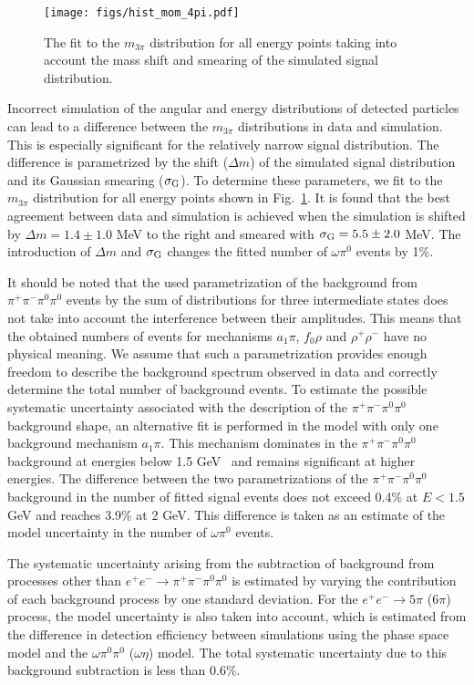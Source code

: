 \documentclass[twocolumn,aps,prd,floatfix,nofootinbib,superscriptaddress]{revtex4-2}
\begin{document}
\begin{figure}
\centering
\texttt{[image: figs/hist\_mom\_4pi.pdf]}
\caption{
	The fit to the $m_{3\pi}$ distribution for all energy points taking into account the mass shift and smearing of the simulated signal distribution.
}
\label{fig:masshist}
\end{figure}

Incorrect simulation of the angular and energy distributions of detected particles can lead to a difference between the $m_{3\pi}$ distributions in data and simulation.
This is especially significant for the relatively narrow signal distribution.
The difference is parametrized by the shift ($\Delta m$) of the simulated signal distribution and its Gaussian smearing ($\sigma_{\rm G}$).
To determine these parameters, we fit to the $m_{3\pi}$ distribution for all energy points shown in Fig.~\ref{fig:masshist}.
It is found that the best agreement between data and simulation is achieved when the simulation is shifted by \( \Delta m=1.4 \pm 1.0 \) MeV to the right and smeared with \( \sigma_{\rm G} = 5.5 \pm 2.0 \) MeV.
The introduction of $\Delta m$ and $\sigma_{\rm G}$ changes the fitted number of $\omega\pi^0$ events by 1\%.

It should be noted that the used parametrization of the background from $\pi^+\pi^-\pi^0\pi^0$ events by the sum of distributions for three intermediate states does not take into account the interference between their amplitudes.
This means that the obtained numbers of events for mechanisms $a_1\pi$, $f_0\rho$ and $\rho^+\rho^-$ have no physical meaning.
We assume that such a parametrization provides enough freedom to describe the background spectrum observed in data and correctly determine the total number of background events.
To estimate the possible systematic uncertainty associated with the description of the $\pi^+\pi^-\pi^0\pi^0$ background shape, an alternative fit is performed in the model with only one background mechanism $a_1\pi$.
This mechanism dominates in the $\pi^+\pi^-\pi^0\pi^0$ background at energies below 1.5 GeV~\cite{kozyrev} and remains significant at higher energies.
The difference between the two parametrizations of the $\pi^+\pi^-\pi^0\pi^0$ background in the number of fitted signal events does not exceed 0.4\% at $E<1.5$ GeV and reaches 3.9\% at 2 GeV.
This difference is taken as an estimate of the model uncertainty in the number of $\omega\pi^0$ events.

The systematic uncertainty arising from the subtraction of background from processes other than \( e^+e^- \to \pi^+\pi^-\pi^0\pi^0 \) is estimated by varying the contribution of each background process by one standard deviation.
For the $e^+e^-\to 5\pi$ ($6\pi$) process, the model uncertainty is also taken into account, which is estimated from the difference in detection efficiency between simulations using the phase space model and the $\omega\pi^0\pi^0$ ($\omega\eta$) model.
The total systematic uncertainty due to this background subtraction is less than 0.6\%.
\end{document}
